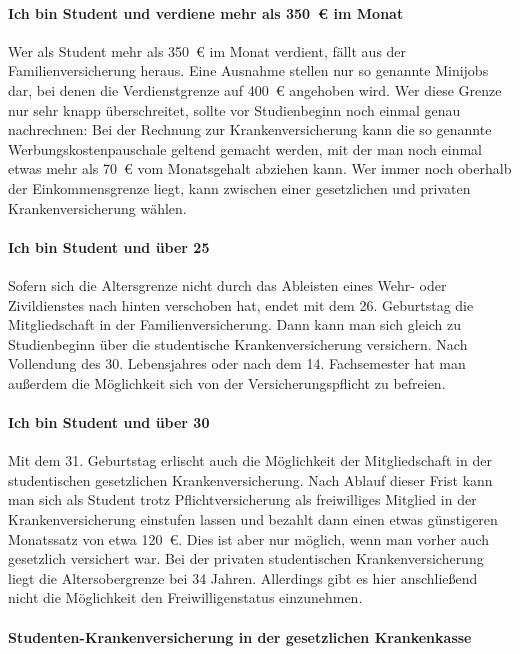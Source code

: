 \paragraph{Ich bin Student und verdiene mehr als 350~€ im Monat}

Wer als Student mehr als 350~€ im Monat verdient, fällt aus der
Familienversicherung heraus. Eine Ausnahme stellen nur so genannte
Minijobs dar, bei denen die Verdienstgrenze auf 400~€ angehoben
wird. Wer diese Grenze nur sehr knapp überschreitet, sollte vor
Studienbeginn noch einmal genau nachrechnen: Bei der Rechnung zur
Krankenversicherung kann die so genannte Werbungskostenpauschale
geltend gemacht werden, mit der man noch einmal etwas mehr als 70~€
vom Monatsgehalt abziehen kann. Wer immer noch oberhalb der
Einkommensgrenze liegt, kann zwischen einer gesetzlichen und privaten
Krankenversicherung wählen.

\paragraph{Ich bin Student und über 25}

Sofern sich die Altersgrenze nicht durch das Ableisten eines Wehr-
oder Zivildienstes nach hinten verschoben hat, endet mit dem
26. Geburtstag die Mitgliedschaft in der Familienversicherung. Dann
kann man sich gleich zu Studienbeginn über die studentische
Krankenversicherung versichern. Nach Vollendung des 30. Lebensjahres
oder nach dem 14. Fachsemester hat man außerdem die Möglichkeit sich
von der Versicherungspflicht zu befreien.

\paragraph{Ich bin Student und über 30}

Mit dem 31. Geburtstag erlischt auch die Möglichkeit der
Mitgliedschaft in der studentischen gesetzlichen
Krankenversicherung. Nach Ablauf dieser Frist kann man sich als
Student trotz Pflichtversicherung als freiwilliges Mitglied in der
Krankenversicherung einstufen lassen und bezahlt dann einen etwas
günstigeren Monatssatz von etwa 120~€. Dies ist aber nur möglich, wenn
man vorher auch gesetzlich versichert war. Bei der privaten
studentischen Krankenversicherung liegt die Altersobergrenze bei 34
Jahren. Allerdings gibt es hier anschließend nicht die Möglichkeit den
Freiwilligenstatus einzunehmen.

\paragraph{Studenten-Krankenversicherung in der gesetzlichen Krankenkasse}

